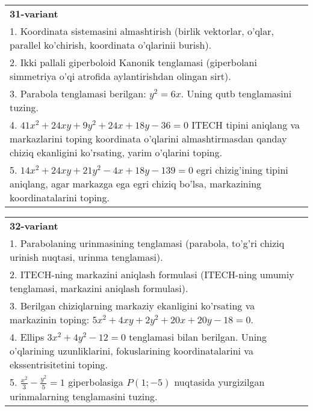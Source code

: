 \documentclass{article}
\begin{document}
\begin{tabular}{m{17cm}}
\textbf{31-variant}\\
1. Koordinata sistemasini almashtirish (birlik vektorlar, o'qlar, parallel ko'chirish, koordinata o'qlarinii burish).\\

2. Ikki pallali giperboloid Kanonik tenglamasi (giperbolani simmetriya o'qi atrofida aylantirishdan olingan sirt).\\

3. Parabola tenglamasi berilgan: $y^2=6x$. Uning qutb tenglamasini tuzing.\\

4. $41x^{2} + 24xy + 9y^{2} + 24x + 18y - 36 = 0$ ITECH tipini aniqlang va markazlarini toping koordinata o'qlarini almashtirmasdan qanday chiziq ekanligini ko'rsating, yarim o'qlarini toping.  \\

5. $14x^{2} + 24xy + 21y^{2} - 4x + 18y - 139 = 0$ egri chizig'ining tipini aniqlang, agar markazga ega egri chiziq bo'lsa, markazining koordinatalarini toping.  
\end{tabular}
\vspace{1cm}


\begin{tabular}{m{17cm}}
\textbf{32-variant}\\
1. Parabolaning urinmasining tenglamasi (parabola, to'g'ri chiziq urinish nuqtasi, urinma tenglamasi).\\

2. ITECH-ning markazini aniqlash formulasi (ITECH-ning umumiy tenglamasi, markazini aniqlash formulasi).\\

3. Berilgan chiziqlarning markaziy ekanligini ko'rsating va markazinin toping: $5x^{2}+4xy+2y^{2}+20x+20y-18=0$.\\

4. Ellips $3x^{2} + 4y^{2} - 12 = 0$ tenglamasi bilan berilgan. Uning o'qlarining uzunliklarini, fokuslarining koordinatalarini va ekssentrisitetini toping.  \\

5. $\frac{x^{2}}{3} - \frac{y^{2}}{5} = 1$ giperbolasiga $P(1; - 5)$ nuqtasida yurgizilgan urinmalarning tenglamasini tuzing.
\end{tabular}
\vspace{1cm}
\end{document}
